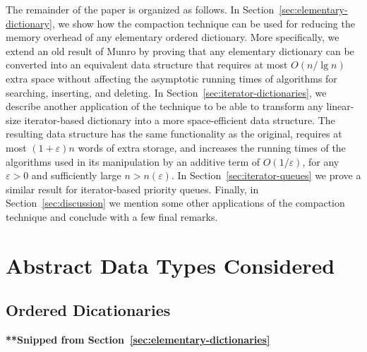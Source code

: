 \documentclass{DIKU-article}
\newcommand{\seclabel}[1]{\label{sec:#1}}
\newcommand{\secref}[1]{\mbox{Section~\ref{sec:#1}}}
\begin{document}
The remainder of the paper is organized as follows.  In
\secref{elementary-dictionary}, we show how the compaction technique
can be used for reducing the memory overhead of any elementary ordered
dictionary. More specifically, we extend an old result of Munro
\cite{Mun86} by proving that any elementary dictionary can be
converted into an equivalent data structure that requires at most
$O(n/\lg n)$ extra space without affecting the asymptotic running
times of algorithms for searching, inserting, and deleting.  In
\secref{iterator-dictionaries}, we describe another application of the
technique to be able to transform any linear-size iterator-based
dictionary into a more space-efficient data structure. The resulting
data structure has the same functionality as the original, requires at
most $(1 + \varepsilon)n$ words of extra storage, and increases the
running times of the algorithms used in its manipulation by an
additive term of $O(1/\varepsilon)$, for any $\varepsilon > 0$ and
sufficiently large $n > n(\varepsilon)$.  In \secref{iterator-queues}
we prove a similar result for iterator-based priority queues.
Finally, in \secref{discussion} we mention some other applications of
the compaction technique and conclude with a few final remarks.

\section{Abstract Data Types Considered}
\seclabel{adts}

\subsection{Ordered Dicationaries}
\noindent\textbf{**Snipped from \secref{elementary-dictionaries}}
\end{document}
